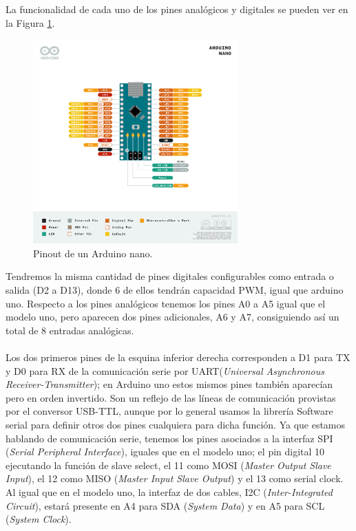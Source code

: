 \documentclass[12pt]{article}
\begin{document}
	\noindent La funcionalidad de cada uno de los pines analógicos y digitales se pueden ver en la Figura \ref{Pinout Arduino nano}. \\
	
	\begin{figure}[h]
		\begin{center}
			\includegraphics[width=0.7\textwidth]{img/Pinout-NANO_official.png}
			\caption{Pinout de un Arduino nano.}
			\label{Pinout Arduino nano}
		\end{center}
	\end{figure}

	\pagebreak
	
	\noindent Tendremos la misma cantidad de pines digitales configurables como entrada o salida (D2 a D13), donde 6 de ellos tendrán capacidad PWM, igual que arduino uno. Respecto a los pines analógicos tenemos los pines A0 a A5 igual que el modelo uno, pero aparecen dos pines adicionales, A6 y A7, consiguiendo así un total de 8 entradas analógicas. \\
	
	 \\
	
	\noindent Los dos primeros pines de la esquina inferior derecha corresponden a D1 para TX y D0 para RX de la comunicación serie por UART(\textit{Universal Asynchronous Receiver-Transmitter}); en Arduino uno estos mismos pines también aparecían pero en orden invertido. Son un reflejo de las líneas de comunicación provistas por el conversor USB-TTL, aunque por lo general usamos la librería Software serial para definir otros dos pines cualquiera para dicha función. Ya que estamos hablando de comunicación serie, tenemos los pines asociados a la interfaz SPI (\textit{Serial Peripheral Interface}), iguales que en el modelo uno; el pin digital 10 ejecutando la función de slave select, el 11 como MOSI (\textit{Master Output Slave Input}), el 12 como MISO (\textit{Master Input Slave Output}) y el 13 como serial clock. Al igual que en el modelo uno, la interfaz de dos cables, I2C (\textit{Inter-Integrated Circuit}), estará presente en A4 para SDA (\textit{System Data}) y en A5 para SCL (\textit{System Clock}). \\
	
\end{document}
